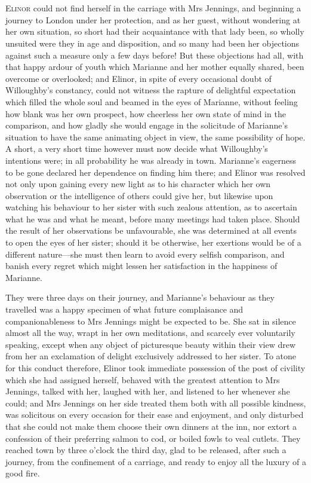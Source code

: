 \chapter[Chapter \thechapter]{}
\lettrine[lraise=0.3]{E}{linor} could not find herself in the carriage with Mrs Jennings, and beginning a journey to London under her protection, and as her guest, without wondering at her own situation, so short had their acquaintance with that lady been, so wholly unsuited were they in age and disposition, and so many had been her objections against such a measure only a few days before! But these objections had all, with that happy ardour of youth which Marianne and her mother equally shared, been overcome or overlooked; and Elinor, in spite of every occasional doubt of Willoughby's constancy, could not witness the rapture of delightful expectation which filled the whole soul and beamed in the eyes of Marianne, without feeling how blank was her own prospect, how cheerless her own state of mind in the comparison, and how gladly she would engage in the solicitude of Marianne's situation to have the same animating object in view, the same possibility of hope. A short, a very short time however must now decide what Willoughby's intentions were; in all probability he was already in town. Marianne's eagerness to be gone declared her dependence on finding him there; and Elinor was resolved not only upon gaining every new light as to his character which her own observation or the intelligence of others could give her, but likewise upon watching his behaviour to her sister with such zealous attention, as to ascertain what he was and what he meant, before many meetings had taken place. Should the result of her observations be unfavourable, she was determined at all events to open the eyes of her sister; should it be otherwise, her exertions would be of a different nature—she must then learn to avoid every selfish comparison, and banish every regret which might lessen her satisfaction in the happiness of Marianne.

They were three days on their journey, and Marianne's behaviour as they travelled was a happy specimen of what future complaisance and companionableness to Mrs Jennings might be expected to be. She sat in silence almost all the way, wrapt in her own meditations, and scarcely ever voluntarily speaking, except when any object of picturesque beauty within their view drew from her an exclamation of delight exclusively addressed to her sister. To atone for this conduct therefore, Elinor took immediate possession of the post of civility which she had assigned herself, behaved with the greatest attention to Mrs Jennings, talked with her, laughed with her, and listened to her whenever she could; and Mrs Jennings on her side treated them both with all possible kindness, was solicitous on every occasion for their ease and enjoyment, and only disturbed that she could not make them choose their own dinners at the inn, nor extort a confession of their preferring salmon to cod, or boiled fowls to veal cutlets. They reached town by three o'clock the third day, glad to be released, after such a journey, from the confinement of a carriage, and ready to enjoy all the luxury of a good fire.

